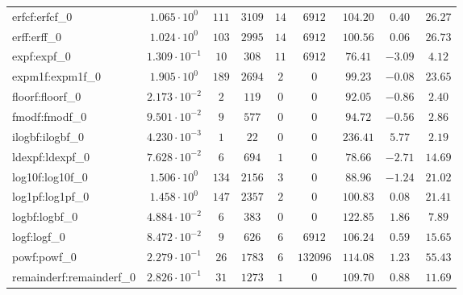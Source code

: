 \begin{tabular}{|l|c|c|c|c|c|c|c|c|}
erfcf:erfcf\_0               & $ 1.065 \cdot 10^{0}  $ & $ 111    $ & $ 3109  $ & $ 14  $ & $ 6912   $ & $ 104.20      $ & $ 0.40    $ & $ 26.27   $ \\
erff:erff\_0                 & $ 1.024 \cdot 10^{0}  $ & $ 103    $ & $ 2995  $ & $ 14  $ & $ 6912   $ & $ 100.56      $ & $ 0.06    $ & $ 26.73   $ \\
expf:expf\_0                 & $ 1.309 \cdot 10^{-1} $ & $ 10     $ & $ 308   $ & $ 11  $ & $ 6912   $ & $ 76.41       $ & $ -3.09   $ & $ 4.12    $ \\
expm1f:expm1f\_0             & $ 1.905 \cdot 10^{0}  $ & $ 189    $ & $ 2694  $ & $ 2   $ & $ 0      $ & $ 99.23       $ & $ -0.08   $ & $ 23.65   $ \\
floorf:floorf\_0             & $ 2.173 \cdot 10^{-2} $ & $ 2      $ & $ 119   $ & $ 0   $ & $ 0      $ & $ 92.05       $ & $ -0.86   $ & $ 2.40    $ \\
fmodf:fmodf\_0               & $ 9.501 \cdot 10^{-2} $ & $ 9      $ & $ 577   $ & $ 0   $ & $ 0      $ & $ 94.72       $ & $ -0.56   $ & $ 2.86    $ \\
ilogbf:ilogbf\_0             & $ 4.230 \cdot 10^{-3} $ & $ 1      $ & $ 22    $ & $ 0   $ & $ 0      $ & $ 236.41      $ & $ 5.77    $ & $ 2.19    $ \\
ldexpf:ldexpf\_0             & $ 7.628 \cdot 10^{-2} $ & $ 6      $ & $ 694   $ & $ 1   $ & $ 0      $ & $ 78.66       $ & $ -2.71   $ & $ 14.69   $ \\
log10f:log10f\_0             & $ 1.506 \cdot 10^{0}  $ & $ 134    $ & $ 2156  $ & $ 3   $ & $ 0      $ & $ 88.96       $ & $ -1.24   $ & $ 21.02   $ \\
log1pf:log1pf\_0             & $ 1.458 \cdot 10^{0}  $ & $ 147    $ & $ 2357  $ & $ 2   $ & $ 0      $ & $ 100.83      $ & $ 0.08    $ & $ 21.41   $ \\
logbf:logbf\_0               & $ 4.884 \cdot 10^{-2} $ & $ 6      $ & $ 383   $ & $ 0   $ & $ 0      $ & $ 122.85      $ & $ 1.86    $ & $ 7.89    $ \\
logf:logf\_0                 & $ 8.472 \cdot 10^{-2} $ & $ 9      $ & $ 626   $ & $ 6   $ & $ 6912   $ & $ 106.24      $ & $ 0.59    $ & $ 15.65   $ \\
powf:powf\_0                 & $ 2.279 \cdot 10^{-1} $ & $ 26     $ & $ 1783  $ & $ 6   $ & $ 132096 $ & $ 114.08      $ & $ 1.23    $ & $ 55.43   $ \\
remainderf:remainderf\_0     & $ 2.826 \cdot 10^{-1} $ & $ 31     $ & $ 1273  $ & $ 1   $ & $ 0      $ & $ 109.70      $ & $ 0.88    $ & $ 11.69   $ \\

\end{tabular}
